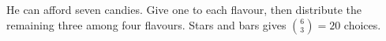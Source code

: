 He can afford seven candies. Give one to each flavour, then distribute the remaining three among four flavours. Stars and bars gives $\binom63=\boxed{20}$ choices.
